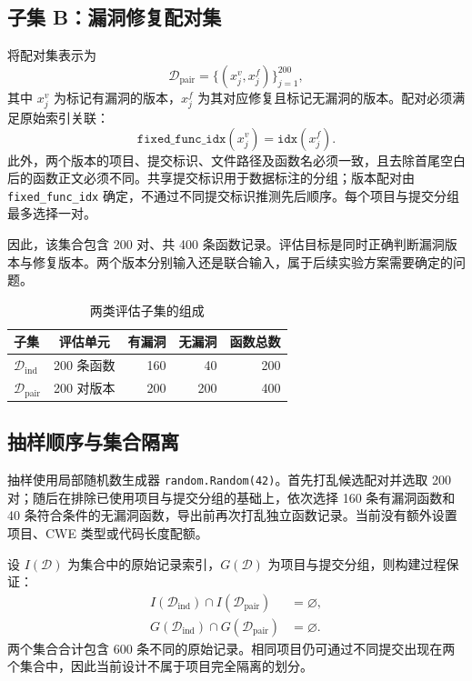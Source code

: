 \documentclass[conference]{IEEEtran}
\begin{document}
\subsection{子集 B：漏洞修复配对集}
将配对集表示为
\begin{equation}
\mathcal{D}_{\mathrm{pair}}=
\{(x_j^{v},x_j^{f})\}_{j=1}^{200},
\end{equation}
其中 $x_j^{v}$ 为标记有漏洞的版本，$x_j^{f}$ 为其对应修复且标记无漏洞的版本。配对必须满足原始索引关联：
\begin{equation}
\texttt{fixed\_func\_idx}(x_j^{v})=\texttt{idx}(x_j^{f}).
\end{equation}
此外，两个版本的项目、提交标识、文件路径及函数名必须一致，且去除首尾空白后的函数正文必须不同。共享提交标识用于数据标注的分组；版本配对由 \texttt{fixed\_func\_idx} 确定，不通过不同提交标识推测先后顺序。每个项目与提交分组最多选择一对。

因此，该集合包含 200 对、共 400 条函数记录。评估目标是同时正确判断漏洞版本与修复版本。两个版本分别输入还是联合输入，属于后续实验方案需要确定的问题。

\begin{table}[t]
\caption{两类评估子集的组成}
\label{tab:composition}
\centering
\begin{tabular}{@{}lcrrr@{}}
\toprule
子集 & 评估单元 & 有漏洞 & 无漏洞 & 函数总数\\
\midrule
$\mathcal{D}_{\mathrm{ind}}$ & 200 条函数 & 160 & 40 & 200\\
$\mathcal{D}_{\mathrm{pair}}$ & 200 对版本 & 200 & 200 & 400\\
\bottomrule
\end{tabular}
\end{table}

\subsection{抽样顺序与集合隔离}
抽样使用局部随机数生成器 \texttt{random.Random(42)}。首先打乱候选配对并选取 200 对；随后在排除已使用项目与提交分组的基础上，依次选择 160 条有漏洞函数和 40 条符合条件的无漏洞函数，导出前再次打乱独立函数记录。当前没有额外设置项目、CWE 类型或代码长度配额。

设 $I(\mathcal{D})$ 为集合中的原始记录索引，$G(\mathcal{D})$ 为项目与提交分组，则构建过程保证：
\begin{align}
I(\mathcal{D}_{\mathrm{ind}})\cap I(\mathcal{D}_{\mathrm{pair}})&=\varnothing,\\
G(\mathcal{D}_{\mathrm{ind}})\cap G(\mathcal{D}_{\mathrm{pair}})&=\varnothing.
\end{align}
两个集合合计包含 600 条不同的原始记录。相同项目仍可通过不同提交出现在两个集合中，因此当前设计不属于项目完全隔离的划分。
\end{document}
